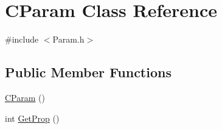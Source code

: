 \hypertarget{classCParam}{}\section{C\+Param Class Reference}
\label{classCParam}


{\ttfamily \#include $<$Param.\+h$>$}

\subsection*{Public Member Functions}
\begin{DoxyCompactItemize}
\item 
\mbox{\hyperlink{classCParam_a97624fd3217162f4883d1b2e368def78}{C\+Param}} ()
\item 
int \mbox{\hyperlink{classCParam_ae85a70e5fa088df9f52e81f1fdd1a283}{Get\+Prop}} ()
\end{DoxyCompactItemize}
